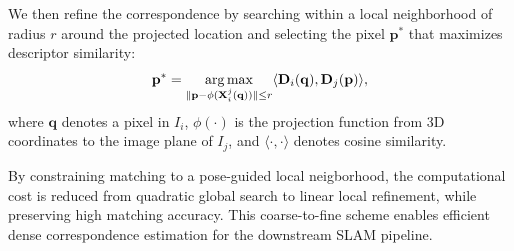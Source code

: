 We then refine the correspondence by searching within a local neighborhood of radius $r$ around the projected location and selecting the pixel $\mathbf{p}^*$ that maximizes descriptor similarity:
\begin{equation}
\mathbf{p}^* = 
\operatorname*{arg\,max}_{\|\mathbf{p} - \phi(\mathbf{X}_i^j(\mathbf{q}))\| \le r}
\langle \mathbf{D}_i(\mathbf{q}), \mathbf{D}_j(\mathbf{p}) \rangle,
\label{eq:fine_match}
\end{equation}
where $\mathbf{q}$ denotes a pixel in $I_i$, 
$\phi(\cdot)$ is the projection function from 3D coordinates to the image plane of $I_j$, 
and $\langle \cdot, \cdot \rangle$ denotes cosine similarity. 

By constraining matching to a pose-guided local neigborhood, the computational cost is reduced from quadratic global search to linear local refinement, while preserving high matching accuracy. This coarse-to-fine scheme enables efficient dense correspondence estimation for the downstream SLAM pipeline.


